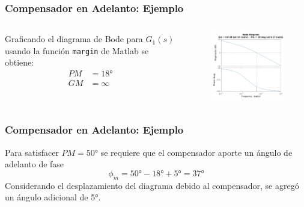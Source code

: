 \documentclass[aspectratio=169, handout]{beamer}
\theoremstyle{definition}
\theoremstyle{plain}
\theoremstyle{remark}
\begin{document}
\begin{frame}[<+->]\frametitle{Compensador en Adelanto: Ejemplo}
	\vspace*{-7mm}
  \begin{columns}
  	\begin{column}{0.4\textwidth}
			Graficando el diagrama de Bode para $G_1(s)$ usando la función \texttt{margin} de Matlab se obtiene:
			\begin{align*}
				PM &= \ang{18}\\
				GM &= \infty
			\end{align*}
  	\end{column}
  	\begin{column}{0.6\textwidth}
			\begin{figure}
				\centering
				\includegraphics[width=8.5cm]{images/bodeLeadCompExample.eps} 	
		  \end{figure}
  	\end{column}
  \end{columns}
\end{frame}

\begin{frame}[<+->]\frametitle{Compensador en Adelanto: Ejemplo}   
	Para satisfacer $PM = \ang{50}$ se requiere que el compensador aporte un ángulo de adelanto de fase 
	\begin{equation*}
		\phi_m = \ang{50} - \ang{18} + \ang{5} = \ang{37}
	\end{equation*}
	Considerando el desplazamiento del diagrama debido al compensador, se agregó un ángulo adicional de \ang{5}.
\end{frame}
\end{document}
